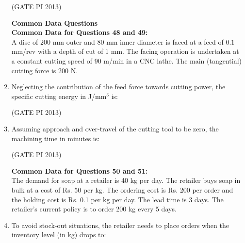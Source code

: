 \documentclass[journal,12pt,onecolumn]{IEEEtran}
\theoremstyle{remark}
\begin{document}
\begin{enumerate}
\hfill (GATE PI 2013)

\textbf{\large{Common Data Questions}} \\
\textbf{Common Data for Questions 48 and 49:}\\
 
 A disc of $200$ mm outer and $80$ mm inner diameter is faced at a feed of $0.1$ mm/rev with a depth of cut of $1$ mm. The facing operation is undertaken at a constant cutting speed of $90$ m/min in a CNC lathe. The main (tangential) cutting force is $200$ N.  \\

\item Neglecting the contribution of the feed force towards cutting power, the specific cutting energy in J/mm$^3$ is:
\begin{enumerate}
\end{enumerate}


\hfill (GATE PI 2013)

\item Assuming approach and over\--travel of the cutting tool to be zero, the machining time in minutes is:
\begin{enumerate}
\end{enumerate}

\hfill (GATE PI 2013)

\textbf{Common Data for Questions 50 and 51:} \\

The demand for soap at a retailer is 40 kg per day. The retailer buys soap in bulk at a cost of Rs. 50 per kg.  
The ordering cost is Rs. 200 per order and the holding cost is Rs. 0.1 per kg per day. The lead time is 3 days.  
The retailer's current policy is to order 200 kg every 5 days.  \\  
\item To avoid stock\--out situations, the retailer needs to place orders when the inventory level (in kg) drops to:
\begin{enumerate}
\end{enumerate}


\end{enumerate}
\end{document}
